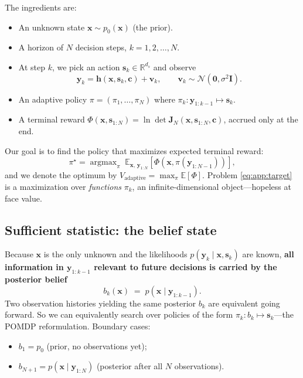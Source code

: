 \documentclass[11pt,a4paper]{article}
\newcommand{\R}{\mathbb{R}}
\newcommand{\E}{\mathbb{E}}
\newcommand{\argmax}{\operatorname{argmax}}
\begin{document}
The ingredients are:
\begin{itemize}[nosep]
  \item An unknown state $\bm{x} \sim p_0(\bm{x})$ (the prior).
  \item A horizon of $N$ decision steps, $k = 1, 2, \ldots, N$.
  \item At step $k$, we pick an action $\bm{s}_k \in \R^{d_s}$ and observe
  \begin{equation}
    \bm{y}_k = \bm{h}(\bm{x}, \bm{s}_k, \bm{c}) + \bm{v}_k, \qquad \bm{v}_k \sim \mathcal{N}(\bm{0}, \sigma^2 \bm{I}).
  \end{equation}
  \item An adaptive policy $\pi = (\pi_1, \ldots, \pi_N)$ where $\pi_k: \bm{y}_{1:k-1} \mapsto \bm{s}_k$.
  \item A terminal reward $\Phi(\bm{x}, \bm{s}_{1:N}) = \ln\det\bm{J}_N(\bm{x}, \bm{s}_{1:N}, \bm{c})$, accrued only at the end.
\end{itemize}

Our goal is to find the policy that maximizes expected terminal reward:
\begin{equation}
  \pi^\star = \argmax_\pi \; \E_{\bm{x},\, \bm{y}_{1:N}}\!\left[\Phi(\bm{x}, \pi(\bm{y}_{1:N-1}))\right],
  \label{eq:app:target}
\end{equation}
and we denote the optimum by $V_{\text{adaptive}} = \max_\pi \E[\Phi]$.  Problem \eqref{eq:app:target} is a maximization over \emph{functions} $\pi_k$, an infinite-dimensional object---hopeless at face value.

\subsection{Sufficient statistic: the belief state}

Because $\bm{x}$ is the only unknown and the likelihoods $p(\bm{y}_k \mid \bm{x}, \bm{s}_k)$ are known, \textbf{all information in $\bm{y}_{1:k-1}$ relevant to future decisions is carried by the posterior belief}
\begin{equation}
  b_k(\bm{x}) \;=\; p(\bm{x} \mid \bm{y}_{1:k-1}).
  \label{eq:app:belief}
\end{equation}
Two observation histories yielding the same posterior $b_k$ are equivalent going forward.  So we can equivalently search over policies of the form $\pi_k: b_k \mapsto \bm{s}_k$---the POMDP reformulation.  Boundary cases:
\begin{itemize}[nosep]
  \item $b_1 = p_0$ (prior, no observations yet);
  \item $b_{N+1} = p(\bm{x} \mid \bm{y}_{1:N})$ (posterior after all $N$ observations).
\end{itemize}
\end{document}
